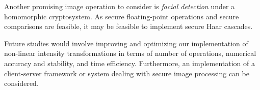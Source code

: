 Another promising image operation to consider is \textit{facial detection} under a homomorphic cryptosystem. 
As secure floating-point operations and secure comparisons are feasible, it may be feasible to implement secure Haar cascades.

Future studies would involve improving and optimizing our implementation of non-linear intensity transformations in terms of number of operations, numerical accuracy and stability, and time efficiency.
Furthermore, an implementation of a client-server framework or system dealing with secure image processing can be considered.
